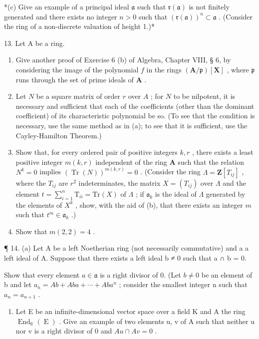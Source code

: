 *(c) Give an example of a principal ideal \(\mathfrak{a}\) such that \(\mathfrak{r}(\mathfrak{a})\) is not finitely generated and there exists no integer \(n > 0\) such that \((\mathfrak{r}(\mathfrak{a}))^n \subset \mathfrak{a}\) . (Consider the ring of a non-discrete valuation of height 1.)*

13. Let A be a ring.\par

\begin{enumerate}
\def\labelenumi{(\alph{enumi})}
\item
  Give another proof of Exercise 6 (b) of Algebra, Chapter VIII, § 6, by considering the image of the polynomial \(f\) in the rings \((\mathbf{A} / \mathfrak{p})[\mathbf{X}]\) , where \(\mathfrak{p}\) runs through the set of prime ideals of \(\mathbf{A}\) .
\item
  Let \(N\) be a square matrix of order \(r\) over \(A\) ; for \(N\) to be nilpotent, it is necessary and sufficient that each of the coefficients (other than the dominant coefficient) of its characteristic polynomial be so. (To see that the condition is necessary, use the same method as in (a); to see that it is sufficient, use the Cayley-Hamilton Theorem.)
\item
  Show that, for every ordered pair of positive integers \(k, r\) , there exists a least positive integer \(m(k, r)\) independent of the ring \(\mathbf{A}\) such that the relation \(N^k = 0\) implies \((\operatorname{Tr}(N))^{m(k,r)} = 0\) . (Consider the ring \(\Lambda = \mathbf{Z}[T_{ij}]\) , where the \(T_{ij}\) are \(r^2\) indeterminates, the matrix \(X = (T_{ij})\) over \(\Lambda\) and the element \(t = \sum_{i=1}^{n} \mathrm{T}_{ii} = \mathrm{Tr}(X)\) of \(\Lambda\) ; if \(\mathfrak{a}_k\) is the ideal of \(\Lambda\) generated by the elements of \(X^k\) , show, with the aid of (b), that there exists an integer \(m\) such that \(t^m \in \mathfrak{a}_k\) .)
\item
  Show that \(m(2, 2) = 4\) .
\end{enumerate}

¶ 14. (a) Let A be a left Noetherian ring (not necessarily commutative) and a a left ideal of A. Suppose that there exists a left ideal b ≠ 0 such that a ∩ b = 0.

Show that every element \(a \in \mathfrak{a}\) is a right divisor of 0. (Let \(b \neq 0\) be an element of b and let \(a_{n} = Ab + Aba + \cdots + Aba^{n}\) ; consider the smallest integer n such that \(a_{n} = a_{n+1}\) .

\begin{enumerate}
\def\labelenumi{(\alph{enumi})}
\setcounter{enumi}{1}
\tightlist
\item
  Let E be an infinite-dimensional vector space over a field K and A the ring \(\operatorname{End}_{\mathbb{K}}(\operatorname{E})\) . Give an example of two elements u, v of A such that neither u nor v is a right divisor of 0 and \(Au \cap Av = 0\) .
\end{enumerate}


